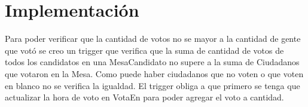 \section{Implementación}


Para poder verificar que la cantidad de votos no se mayor a la cantidad de gente que votó se creo un trigger que verifica que la suma de  cantidad de votos de todos los  candidatos en una MesaCandidato no supere a la suma de Ciudadanos que votaron en la Mesa. Como puede haber ciudadanos que no voten o que voten en blanco no se verifica la igualdad. 
	El trigger obliga  a que primero se tenga que actualizar la hora de voto en VotaEn para poder agregar el voto a cantidad. 

